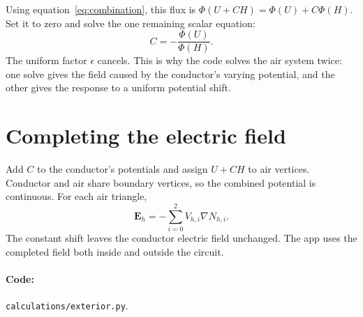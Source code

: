 \documentclass[11pt]{article}
\begin{document}
Using equation~\eqref{eq:combination}, this flux is
$\Phi(U+CH)=\Phi(U)+C\Phi(H)$. Set it to zero and solve the one remaining
scalar equation:
\begin{equation}
 C=-\frac{\Phi(U)}{\Phi(H)}.
\end{equation}
The uniform factor $\epsilon$ cancels. This is why the code solves
the air system twice: one solve gives the field caused by the
conductor's varying potential, and the other gives the response to
a uniform potential shift.

\section{Completing the electric field}
Add $C$ to the conductor's potentials and assign $U+CH$ to
air vertices. Conductor and air share boundary vertices, so the
combined potential is continuous. For each air triangle,
\begin{equation}
 \bm E_h=-\sum_{i=0}^2 V_{h,i}\nabla N_{h,i}.
\end{equation}
The constant shift leaves the conductor electric field unchanged.
The app uses the completed field both inside and outside the circuit.

\paragraph{Code:} \texttt{calculations/exterior.py}.
\end{document}
